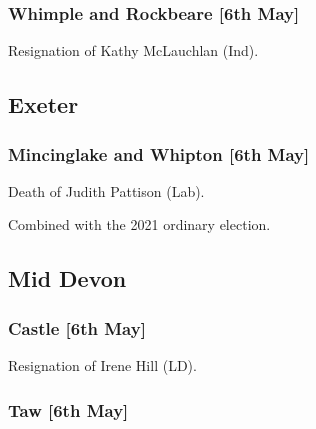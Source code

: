 \documentclass[a4paper,openany]{book}
\begin{document}
\begin{resultsiii}
\subsubsection*{Whimple and Rockbeare \hspace*{\fill}\nolinebreak[1]%
	\enspace\hspace*{\fill}
	[6th May]}


Resignation of Kathy McLauchlan (Ind).

\subsection*{Exeter}

\subsubsection*{Mincinglake and Whipton \hspace*{\fill}\nolinebreak[1]%
	\enspace\hspace*{\fill}
	[6th May]}


Death of Judith Pattison (Lab).

Combined with the 2021 ordinary election.

\subsection*{Mid Devon}

\subsubsection*{Castle \hspace*{\fill}\nolinebreak[1]%
	\enspace\hspace*{\fill}
	[6th May]}


Resignation of Irene Hill (LD).

\subsubsection*{Taw \hspace*{\fill}\nolinebreak[1]%
	\enspace\hspace*{\fill}
	[6th May]}


\end{resultsiii}
\end{document}
